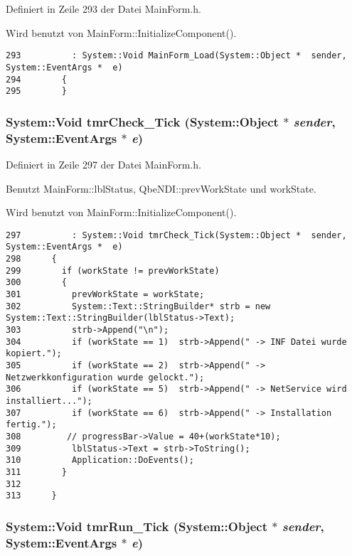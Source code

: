 Definiert in Zeile 293 der Datei Main\-Form.h.

Wird benutzt von Main\-Form::Initialize\-Component().



\footnotesize\begin{verbatim}293          : System::Void MainForm_Load(System::Object *  sender, System::EventArgs *  e)
294        {
295        }
\end{verbatim}\normalsize 
\hypertarget{classQbeNDI_1_1MainForm_QbeNDI_1_1MainFormd3}{
\subsubsection[tmrCheck\_\-Tick]{\setlength{\rightskip}{0pt plus 5cm}System::Void tmr\-Check\_\-Tick (System::Object $\ast$ {\em sender}, System::Event\-Args $\ast$ {\em e})}}
\label{classQbeNDI_1_1MainForm_QbeNDI_1_1MainFormd3}




Definiert in Zeile 297 der Datei Main\-Form.h.

Benutzt Main\-Form::lbl\-Status, Qbe\-NDI::prev\-Work\-State und work\-State.

Wird benutzt von Main\-Form::Initialize\-Component().



\footnotesize\begin{verbatim}297          : System::Void tmrCheck_Tick(System::Object *  sender, System::EventArgs *  e)
298      {
299        if (workState != prevWorkState)
300        {
301          prevWorkState = workState;
302          System::Text::StringBuilder* strb = new System::Text::StringBuilder(lblStatus->Text);
303          strb->Append("\n");
304          if (workState == 1)  strb->Append(" -> INF Datei wurde kopiert.");
305          if (workState == 2)  strb->Append(" -> Netzwerkkonfiguration wurde gelockt.");
306          if (workState == 5)  strb->Append(" -> NetService wird installiert...");
307          if (workState == 6)  strb->Append(" -> Installation fertig.");
308         // progressBar->Value = 40+(workState*10);
309          lblStatus->Text = strb->ToString();
310          Application::DoEvents();
311        }
312 
313      }
\end{verbatim}\normalsize 
\hypertarget{classQbeNDI_1_1MainForm_QbeNDI_1_1MainFormd1}{
\subsubsection[tmrRun\_\-Tick]{\setlength{\rightskip}{0pt plus 5cm}System::Void tmr\-Run\_\-Tick (System::Object $\ast$ {\em sender}, System::Event\-Args $\ast$ {\em e})}}
\label{classQbeNDI_1_1MainForm_QbeNDI_1_1MainFormd1}




